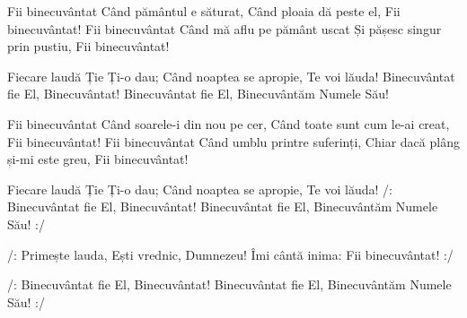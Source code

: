 \beginverse
Fii binecuvântat
Când pământul e săturat,
Când ploaia dă peste el,
Fii binecuvântat!
Fii binecuvântat
Când mă aflu pe pământ uscat
Și pășesc singur prin pustiu,
Fii binecuvântat!
\endverse

\beginchorus
Fiecare laudă Ție Ți-o dau;
Când noaptea se apropie,
Te voi lăuda!
Binecuvântat fie El,
Binecuvântat!
Binecuvântat fie El,
Binecuvântăm Numele Său!
\endchorus

\beginverse
Fii binecuvântat
Când soarele-i din nou pe cer,
Când toate sunt cum le-ai creat,
Fii binecuvântat!
Fii binecuvântat
Când umblu printre suferinți,
Chiar dacă plâng și-mi este greu,
Fii binecuvântat!
\endverse

\beginchorus
Fiecare laudă Ție Ți-o dau;
Când noaptea se apropie,
Te voi lăuda!
/: Binecuvântat fie El,
Binecuvântat!
Binecuvântat fie El,
Binecuvântăm Numele Său! :/
\endchorus

\beginverse*
/: Primește lauda,
Ești vrednic, Dumnezeu!
Îmi cântă inima:
Fii binecuvântat! :/
\endverse

\beginchorus
/: Binecuvântat fie El,
Binecuvântat!
Binecuvântat fie El,
Binecuvântăm Numele Său! :/
\endchorus
\endsong